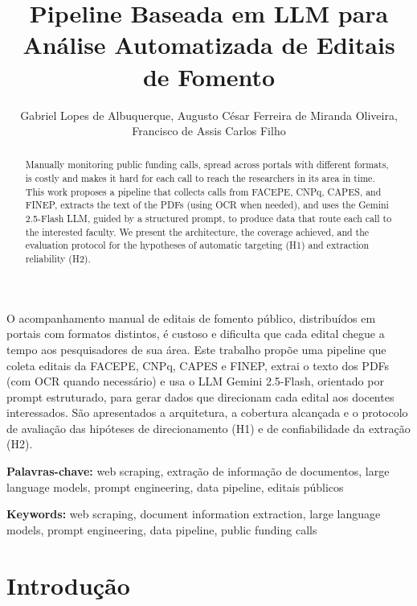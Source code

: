 \documentclass[12pt]{article}
\title{Pipeline Baseada em LLM para Análise Automatizada de Editais de Fomento}
\author{Gabriel Lopes de Albuquerque, Augusto César Ferreira de Miranda Oliveira,\\ Francisco de Assis Carlos Filho}
\begin{document}
  \maketitle

  \begin{abstract}
    Manually monitoring public funding calls, spread across portals with different formats, is costly and makes it hard for each call to reach the researchers in its area in time. This work proposes a pipeline that collects calls from FACEPE, CNPq, CAPES, and FINEP, extracts the text of the PDFs (using OCR when needed), and uses the Gemini 2.5-Flash LLM, guided by a structured prompt, to produce data that route each call to the interested faculty. We present the architecture, the coverage achieved, and the evaluation protocol for the hypotheses of automatic targeting (H1) and extraction reliability (H2).
  \end{abstract}

  \begin{resumo}
    O acompanhamento manual de editais de fomento público, distribuídos em portais com formatos distintos, é custoso e dificulta que cada edital chegue a tempo aos pesquisadores de sua área. Este trabalho propõe uma pipeline que coleta editais da FACEPE, CNPq, CAPES e FINEP, extrai o texto dos PDFs (com OCR quando necessário) e usa o LLM Gemini 2.5-Flash, orientado por prompt estruturado, para gerar dados que direcionam cada edital aos docentes interessados. São apresentados a arquitetura, a cobertura alcançada e o protocolo de avaliação das hipóteses de direcionamento (H1) e de confiabilidade da extração (H2).
  \end{resumo}

  \noindent\textbf{Palavras-chave:} web scraping, extração de informação de documentos, large language models, prompt engineering, data pipeline, editais públicos

  \noindent\textbf{Keywords:} web scraping, document information extraction, large language models, prompt engineering, data pipeline, public funding calls

  \section{Introdução}\label{sec:introducao}
\end{document}
